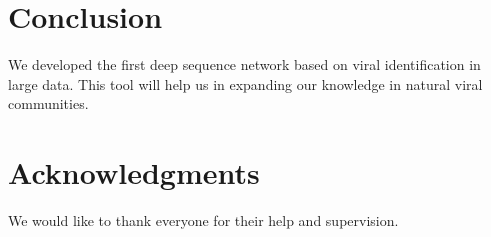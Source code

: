 \documentclass[conference]{IEEEtran}
\begin{document}
\section{Conclusion}

We developed the first deep sequence network based on viral identification in large data. This tool will help us in expanding our knowledge in natural viral communities.

\section*{Acknowledgments}

We would like to thank everyone for their help and supervision.




\end{document}
